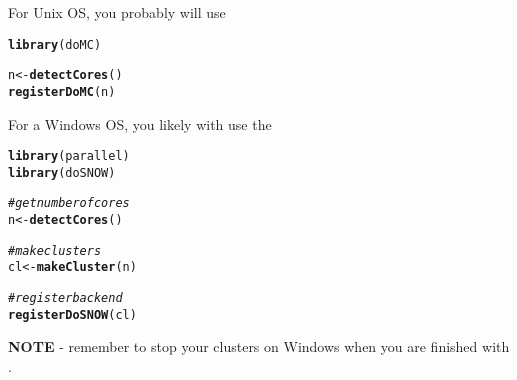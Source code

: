 \documentclass[12pt]{article}\usepackage[]{graphicx}\usepackage[usenames,dvipsnames]{color}
\makeatletter
\newcommand{\hlcom}[1]{\textcolor[rgb]{0.678,0.584,0.686}{\textit{#1}}}%
\newcommand{\hlstd}[1]{\textcolor[rgb]{0.345,0.345,0.345}{#1}}%
\newcommand{\hlkwb}[1]{\textcolor[rgb]{0.69,0.353,0.396}{#1}}%
\newcommand{\hlkwd}[1]{\textcolor[rgb]{0.737,0.353,0.396}{\textbf{#1}}}%
\newenvironment{kframe}{%
 \def\at@end@of@kframe{}%
 \ifinner\ifhmode%
  \def\at@end@of@kframe{\end{minipage}}%
  \begin{minipage}{\columnwidth}%
 \fi\fi%
 \def\FrameCommand##1{\hskip\@totalleftmargin \hskip-\fboxsep
 \colorbox{shadecolor}{##1}\hskip-\fboxsep
     \hskip-\linewidth \hskip-\@totalleftmargin \hskip\columnwidth}%
 \MakeFramed {\advance\hsize-\width
   \@totalleftmargin\z@ \linewidth\hsize
   \@setminipage}}%
 {\par\unskip\endMakeFramed%
 \at@end@of@kframe}
\newenvironment{knitrout}{}{} %
\makeatother
\begin{document}
For Unix OS, you probably will use 

\begin{knitrout}
\color{fgcolor}\begin{kframe}
\begin{alltt}
\hlkwd{library}\hlstd{(doMC)}

\hlstd{n} \hlkwb{<-} \hlkwd{detectCores}\hlstd{()}
\hlkwd{registerDoMC}\hlstd{(n)}
\end{alltt}
\end{kframe}
\end{knitrout}

For a Windows OS, you likely with use the 

\begin{knitrout}
\color{fgcolor}\begin{kframe}
\begin{alltt}
\hlkwd{library}\hlstd{(parallel)}
\hlkwd{library}\hlstd{(doSNOW)}

\hlcom{# get number of cores}
\hlstd{n} \hlkwb{<-} \hlkwd{detectCores}\hlstd{()}

\hlcom{# make clusters}
\hlstd{cl} \hlkwb{<-} \hlkwd{makeCluster}\hlstd{(n)}

\hlcom{# register backend}
\hlkwd{registerDoSNOW}\hlstd{(cl)}
\end{alltt}
\end{kframe}
\end{knitrout}

\textbf{NOTE} - remember to stop your clusters on Windows when you are finished 
with .
\end{document}
